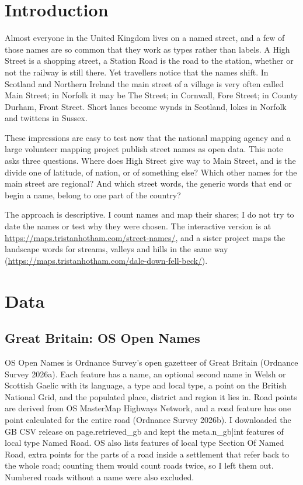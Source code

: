 \documentclass[11pt,a4paper]{article}
\begin{document}
\section{Introduction}

Almost everyone in the United Kingdom lives on a named street, and a few of those names are so common that they work as types rather than labels. A High Street is a shopping street, a Station Road is the road to the station, whether or not the railway is still there. Yet travellers notice that the names shift. In Scotland and Northern Ireland the main street of a village is very often called Main Street; in Norfolk it may be The Street; in Cornwall, Fore Street; in County Durham, Front Street. Short lanes become wynds in Scotland, lokes in Norfolk and twittens in Sussex.

These impressions are easy to test now that the national mapping agency and a large volunteer mapping project publish street names as open data. This note asks three questions. Where does High Street give way to Main Street, and is the divide one of latitude, of nation, or of something else? Which other names for the main street are regional? And which street words, the generic words that end or begin a name, belong to one part of the country?

The approach is descriptive. I count names and map their shares; I do not try to date the names or test why they were chosen. The interactive version is at \url{https://maps.tristanhotham.com/street-names/}, and a sister project maps the landscape words for streams, valleys and hills in the same way (\url{https://maps.tristanhotham.com/dale-down-fell-beck/}).

\section{Data}

\subsection{Great Britain: OS Open Names}

OS Open Names is Ordnance Survey's open gazetteer of Great Britain (Ordnance Survey 2026a). Each feature has a name, an optional second name in Welsh or Scottish Gaelic with its language, a type and local type, a point on the British National Grid, and the populated place, district and region it lies in. Road points are derived from OS MasterMap Highways Network, and a road feature has one point calculated for the entire road (Ordnance Survey 2026b). I downloaded the GB CSV release on {{page.retrieved_gb}} and kept the {{meta.n_gb|int}} features of local type Named Road. OS also lists features of local type Section Of Named Road, extra points for the parts of a road inside a settlement that refer back to the whole road; counting them would count roads twice, so I left them out. Numbered roads without a name were also excluded.
\end{document}
